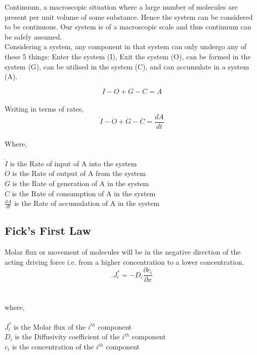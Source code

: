 \documentclass[10pt, a4paper]{article}
\begin{document}
Continuum, a macroscopic situation where a large number of molecules are present per unit volume of some substance.  Hence the system can be considered to be continuous. Our system is of a macroscopic scale and thus continuum can be safely assumed. \\

Considering a system, any component in that system can only undergo any of these 5 things: Enter the system (I), Exit the system (O), can be formed in the system (G), can be utilised in the system (C), and can accumulate in a system (A). 

\[I - O + G - C = A\]
\\
Writing in terms of rates, \\

\begin{equation}
    \dot{I} - \dot{O} + \dot{G} - \dot{C} = \frac{dA}{dt}
\end{equation}
\\
Where,\\
\\
$\dot{I}$ is the Rate of input of A into the system \\
$\dot{O}$ is the Rate of output of A from the system \\
$\dot{G}$ is the Rate of generation of A in the system \\
$\dot{C}$ is the Rate of consumption of A in the system \\
$\frac{dA}{dt}$ is the Rate of accumulation of A in the system \\

\subsection{Fick’s First Law}
Molar flux or movement of molecules will be in the negative direction of the acting driving force i.e. from a higher concentration to a lower concentration.\\

\begin{equation}
    \bigg. J_{i}^* = -D_{i} \frac{\partial c_{i}}{\partial x}
\end{equation} \\
\\
where,\\
\\
$J_{i}^*$ is the Molar flux of the $i^{th}$ component\\
$D_{i}$ is the Diffusivity coefficient of the $i^{th}$ component\\
$c_i$ is the concentration of the $i^{th}$ component\\
\end{document}
